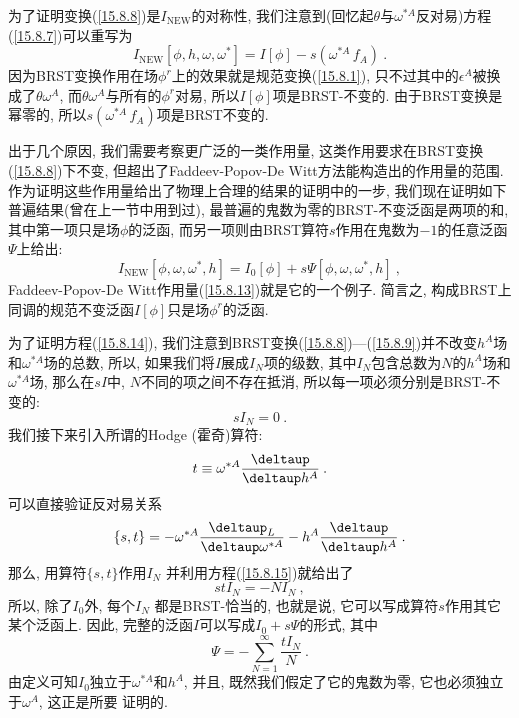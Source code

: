 为了证明变换(\ref{15.8.8})是$I_{\mathrm{NEW}}$的对称性, 我们注意到(回忆起$\theta $与$\omega ^{\ast A}$反对易)方程(\ref{15.8.7})可以重写为
\begin{equation}
I_{\mathrm{NEW}}[\phi ,h,\omega ,\omega ^{\ast }]=I[\phi ]-s(\omega^{\ast A}\,f_{A})\:.   \label{15.8.13}
\end{equation}%
因为BRST变换作用在场$\phi^{r}$上的效果就是规范变换(\ref{15.8.1}), 只不过其中的$\epsilon ^{A}$被换成了$\theta \omega ^{A}$, 
而$\theta \omega ^{A}$与所有的$\phi ^{r}$对易, 所以$I[\phi ]$项是BRST-不变的. 由于BRST变换是幂零的, 所以$s(\omega ^{\ast A}\,f_{A})$项是BRST不变的.

出于几个原因, 我们需要考察更广泛的一类作用量, 这类作用要求在BRST变换(\ref{15.8.8})下不变, 但超出了Faddeev-Popov-De Witt方法能构造出的作用量的范围. 
作为证明这些作用量给出了物理上合理的结果的证明中的一步, 我们现在证明如下普遍结果(曾在上一节中用到过), 
最普遍的鬼数为零的BRST-不变泛函是两项的和, 其中第一项只是场$\phi $的泛函, 而另一项则由BRST算符$s$作用在鬼数为$-1$的任意泛函$\Psi $上给出:%
\begin{equation}
I_{\mathrm{NEW}}[\phi ,\omega ,\omega ^{\ast },h]=I_{0}[\phi ]+s\Psi [
\phi ,\omega ,\omega ^{\ast },h]\:,   \label{15.8.14}
\end{equation}%
Faddeev-Popov-De Witt作用量(\ref{15.8.13})就是它的一个例子. 简言之, 构成BRST上同调的规范不变泛函$I[\phi ]$只是场$\phi ^{r}$的泛函.

为了证明方程(\ref{15.8.14}), 我们注意到BRST变换(\ref{15.8.8})---(\ref{15.8.9})并不改变$h^{A}$场和$\omega^{\ast A}$场的总数, 
所以, 如果我们将$I$展成$I_{N}$项的级数, 其中$I_{N}$包含总数为$N$的$h^{A}$场和$\omega ^{\ast A}$场, 那么在$sI$中, $N$不同的项之间不存在抵消, 
所以每一项必须分别是BRST-不变的:%
\begin{equation}
sI_{N}=0\:.   \label{15.8.15}
\end{equation}%
我们接下来引入所谓的Hodge (霍奇)算符:%
\begin{equation}
t\equiv \omega ^{\ast A}\frac{\deltaup }{\deltaup h^{A}}\:. 
\label{15.8.16}
\end{equation}%
可以直接验证反对易关系\begin{equation}
\{s,t\}=-\omega ^{\ast A}\frac{\deltaup _{L}}{\deltaup \omega ^{\ast A}}-h^{A}%
\frac{\deltaup }{\deltaup h^{A}}\:.   \label{15.8.17}
\end{equation}%
那么, 用算符$\{s,t\}$作用$I_{N}$%
并利用方程(\ref{15.8.15})就给出了\begin{equation}
stI_{N}=-NI_{N}\:,   \label{15.8.18}
\end{equation}%
所以, 除了$I_{0}$外, 每个$I_{N}$%
都是BRST-恰当的, 也就是说, 它可以写成算符$s$作用其它某个泛函上. 因此, 完整的泛函$I$可以写成$I_{0}+s\Psi $的形式, 其中%
\begin{equation}
\Psi =-\sum_{N=1}^{\infty }\frac{tI_{N}}{N}\:.   \label{15.8.19}
\end{equation}%
由定义可知$I_{0}$独立于$\omega ^{\ast A}$和$h^{A}$, 并且, 既然我们假定了它的鬼数为零, 它也必须独立于$\omega ^{A}$, 这正是所要%
证明的.

